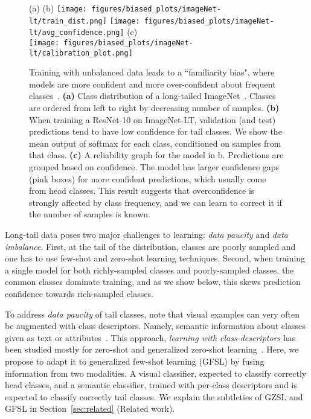 \documentclass[10pt,twocolumn,letterpaper]{article}
\newcommand{\secref}[1]{Section~\ref{#1}}
\begin{document}
\begin{figure}
    (a) \hspace{120pt}
    (b) \hspace{90pt}
    \centering
   \texttt{[image: figures/biased\_plots/imageNet-lt/train\_dist.png]}
   \texttt{[image: figures/biased\_plots/imageNet-lt/avg\_confidence.png]}
   (c)\\
   \texttt{[image: figures/biased\_plots/imageNet-lt/calibration\_plot.png]}
    \caption{{Training with unbalanced data leads to a ``familiarity bias", where models are more confident and more over-confident about frequent classes~\cite{cpe,Wallace2013ImprovingCP,buda2017systematic}.
    \textbf{(a)} Class distribution of a long-tailed ImageNet~\cite{Deng2009ImageNetAL}. Classes are ordered from left to right by decreasing number of samples. \textbf{(b)} When training a ResNet-10 on ImageNet-LT, validation (and test) predictions tend to have low confidence for tail classes. We show the mean output of softmax for each class, conditioned on samples from that class. \textbf{(c)} A reliability graph for the model in b.
    Predictions are grouped based on confidence. 
    The model has larger confidence gaps (pink boxes) for more confident predictions, which usually come from head classes. 
    This result suggests that overconfidence is strongly affected by class frequency, and we can learn to correct it if the number of samples is known.}
    }
    \label{fig:unbalance}
\end{figure}

Long-tail data poses two major challenges to learning: \textit{data paucity} and \textit{data imbalance}. First, at the tail of the distribution, classes are poorly sampled and one has to use few-shot and zero-shot learning techniques. Second, when training a single model for both richly-sampled classes and poorly-sampled classes, the common classes dominate training, and as we show below, this skews prediction confidence towards rich-sampled classes. 

To address \textit{data paucity} of tail classes, note that visual examples can very often be augmented with class descriptors. Namely,  semantic information about classes given as text or attributes~\cite{DAP,Reed,LAGO,xianCVPR}.
This approach, \textit{learning with class-descriptors} has been studied mostly for zero-shot and generalized zero-shot learning~\cite{Schnfeld2019GeneralizedZL,PambalaGenerativeMW,REVISE,xianCVPR,Xian2019FVAEGAND2AF}. Here, we propose to adapt it to generalized few-shot learning (GFSL) by fusing information from two modalities. A visual classifier, expected to classify correctly head classes, and a semantic classifier, trained with per-class descriptors and is expected to classify correctly tail classes. We explain the subtleties of GZSL and GFSL in \secref{sec:related} (Related work). 
\end{document}
